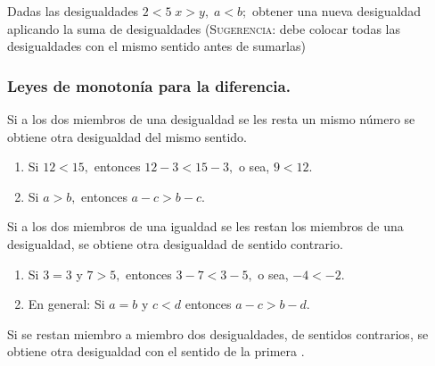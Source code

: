 \documentclass[oneside,english,spanish,2m,twoside,svgnames,x11names,HTML,twoside,12pt]{libro-matua}\usepackage[]{graphicx}\usepackage[]{color}
\newcommand{\noun}[1]{\textsc{#1}}
\begin{document}
\begin{ejercicio}[]

Dadas las desigualdades $2<5\;x>y,\;a<b;$ obtener una nueva desigualdad
aplicando la suma de desigualdades (\noun{Sugerencia}: debe colocar
todas las desigualdades con el mismo sentido antes de sumarlas)

\end{ejercicio}

\subsubsection{Leyes de monotonía para la diferencia.}

\vspace*{10pt}

\begin{propiedad}{}

Si a los dos miembros de una desigualdad se les resta un mismo número
se obtiene otra desigualdad del mismo sentido.

\end{propiedad}

\begin{ejemplos}
\begin{enumerate}
\item Si $12<15,$ entonces $12-3<15-3,$ o sea, $9<12.$
\item Si $a>b,$ entonces $a-c>b-c$.
\end{enumerate}
\end{ejemplos}

\begin{propiedad}{}

Si a los dos miembros de una igualdad se les restan los miembros de
una desigualdad, se obtiene otra desigualdad de sentido contrario.

\end{propiedad}

\begin{ejemplos}
\begin{enumerate}
\item Si $3=3$ y $7>5,$ entonces $3-7<3-5,$ o sea, $-4<-2.$
\item En general: Si $a=b$ y $c<d$ entonces $a-c>b-d$.
\end{enumerate}
\end{ejemplos}

\begin{propiedad}{}

Si se restan miembro a miembro dos desigualdades, de sentidos contrarios,
se obtiene otra desigualdad con el sentido de la primera .

\end{propiedad}
\end{document}
